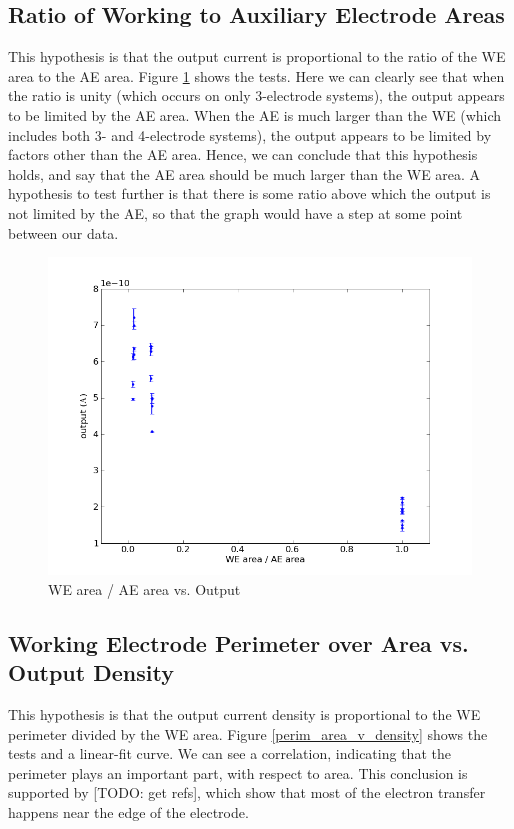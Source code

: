\subsection{Ratio of Working to Auxiliary Electrode Areas}

This hypothesis is that the output current is proportional to the ratio of the WE area to the AE area. Figure \ref{area_ratio_v_output} shows the tests. Here we can clearly see that when the ratio is unity (which occurs on only 3-electrode systems), the output appears to be limited by the AE area. When the AE is much larger than the WE (which includes both 3- and 4-electrode systems), the output appears to be limited by factors other than the AE area. Hence, we can conclude that this hypothesis holds, and say that the AE area should be much larger than the WE area. A hypothesis to test further is that there is some ratio above which the output is not limited by the AE, so that the graph would have a step at some point between our data.

\begin{figure}
	\centering
	\includegraphics[width=0.7\linewidth]{figures/area_ratio_v_output.png}
	\caption{WE area / AE area vs. Output}
	\label{area_ratio_v_output}
\end{figure}

\subsection{Working Electrode Perimeter over Area vs. Output Density}

This hypothesis is that the output current density is proportional to the WE perimeter divided by the WE area. Figure \ref{perim_area_v_density} shows the tests and a linear-fit curve. We can see a correlation, indicating that the perimeter plays an important part, with respect to area. This conclusion is supported by [TODO: get refs], which show that most of the electron transfer happens near the edge of the electrode.

